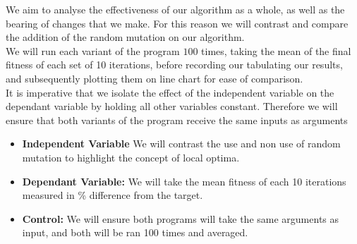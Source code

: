 \documentclass[a4paper]{article}
\begin{document}



We aim to analyse the effectiveness of our algorithm as a whole, as well as the bearing of
changes that we make. For this reason we will contrast and compare the addition of
the random mutation on our algorithm. \\

We will run each variant of the program $100$ times, taking the mean of the 
final fitness of each set of 10 iterations, before recording our tabulating our results, 
and subsequently plotting them on line chart for ease of comparison. \\

It is imperative that we isolate the effect of the independent variable on the dependant variable 
by holding all other variables constant. Therefore we will ensure that both variants of the program
receive the same inputs as arguments\\



\vspace{12mm}

\begin{itemize}
  \item \textbf{Independent Variable} We will contrast the use and non use of random mutation
    to highlight the concept of local optima.
\end{itemize}

\begin{itemize}
  \item \textbf{Dependant Variable:} We will take the mean fitness of each 10 iterations
    measured in \% difference from the target.
\end{itemize}

\begin{itemize}
  \item \textbf{Control:} We will ensure both programs will take the same arguments as input, 
    and both will be ran 100 times and averaged.
\end{itemize}
\end{document}
